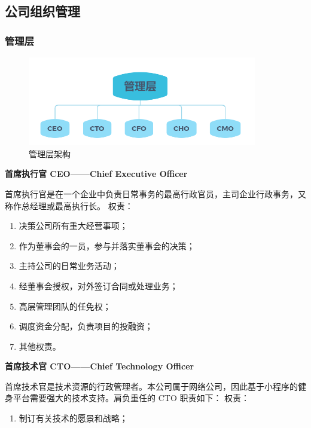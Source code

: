 \documentclass[UTF8,12pt]{ctexart}
\numberwithin{figure}{section}%
\begin{document}
\begin{spacing}{2}
\begin{itemize}
	
\end{itemize}


\subsection{公司组织管理}
\subsubsection{管理层}
\begin{figure}[!htb]
	\centering
	\includegraphics[width=10cm]{fig/17}
	\caption{管理层架构}
\end{figure}

\textbf{首席执行官 CEO——Chief Executive Officer}

首席执行官是在一个企业中负责日常事务的最高行政官员，主司企业行政事务，又称作总经理或最高执行长。
权责：
\begin{enumerate}
	\item 决策公司所有重大经营事项；
	
	\item 作为董事会的一员，参与并落实董事会的决策；
	
	\item 主持公司的日常业务活动；
	
	\item 经董事会授权，对外签订合同或处理业务；
	
	\item 高层管理团队的任免权；
	
	\item 调度资金分配，负责项目的投融资；
	
	\item 其他权责。
	
\end{enumerate}


\textbf{首席技术官 CTO——Chief Technology Officer}

首席技术官是技术资源的行政管理者。本公司属于网络公司，因此基于小程序的健身平台需要强大的技术支持。肩负重任的 CTO 职责如下：
权责：

\begin{enumerate}
	\item 制订有关技术的愿景和战略；
	

\end{enumerate}
\end{spacing}
\end{document}
